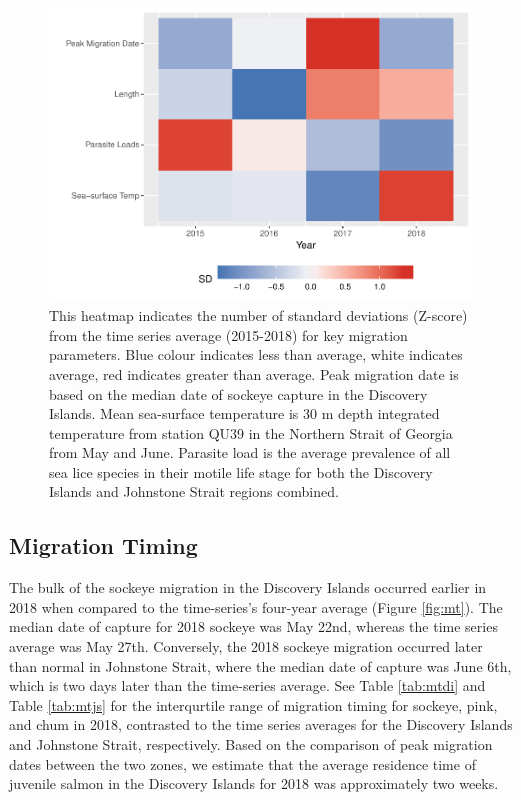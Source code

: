 \documentclass[fleqn,10pt]{wlpeerj} %
\begin{document}
\begin{figure}
\includegraphics[width=0.8\linewidth]{peer_j_migration_dynamics_files/figure-latex/heatmap-1} \caption{This heatmap indicates the number of standard deviations (Z-score) from the time series average (2015-2018) for key migration parameters. Blue colour indicates less than average, white indicates average, red indicates greater than average. Peak migration date is based on the median date of sockeye capture in the Discovery Islands.  Mean sea-surface temperature is 30 m depth integrated temperature from station QU39 in the Northern Strait of Georgia from May and June. Parasite load is the average prevalence of all sea lice species in their motile life stage for both the Discovery Islands and Johnstone Strait regions combined.}\label{fig:heatmap}
\end{figure}

\subsection*{Migration Timing}\label{migration-timing}

The bulk of the sockeye migration in the Discovery Islands occurred
earlier in 2018 when compared to the time-series's four-year average
(Figure \ref{fig:mt}). The median date of capture for 2018 sockeye was
May 22nd, whereas the time series average was May 27th. Conversely, the
2018 sockeye migration occurred later than normal in Johnstone Strait,
where the median date of capture was June 6th, which is two days later
than the time-series average. See Table \ref{tab:mtdi} and Table
\ref{tab:mtjs} for the interqurtile range of migration timing for
sockeye, pink, and chum in 2018, contrasted to the time series averages
for the Discovery Islands and Johnstone Strait, respectively. Based on
the comparison of peak migration dates between the two zones, we
estimate that the average residence time of juvenile salmon in the
Discovery Islands for 2018 was approximately two weeks.
\end{document}
